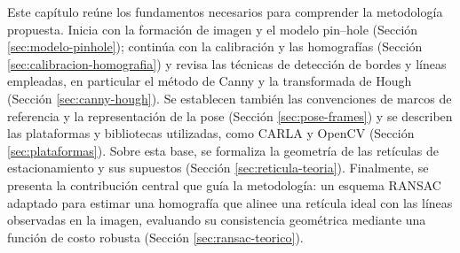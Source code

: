 \noindent  Este   capítulo  reúne  los  fundamentos   necesarios  para
comprender la metodología propuesta. Inicia con la formación de imagen
y el modelo pin--hole (Sección \ref{sec:modelo-pinhole}); continúa con
la       calibración       y      las       homografías       (Sección
\ref{sec:calibracion-homografia}) y  revisa las técnicas  de detección
de bordes  y líneas empleadas, en  particular el método de  Canny y la
transformada de  Hough (Sección \ref{sec:canny-hough}).  Se establecen
también las convenciones  de marcos de referencia  y la representación
de  la  pose  (Sección   \ref{sec:pose-frames})  y  se  describen  las
plataformas  y bibliotecas  utilizadas, como  CARLA y  OpenCV (Sección
\ref{sec:plataformas}). Sobre esta base,  se formaliza la geometría de
las   retículas   de   estacionamiento  y   sus   supuestos   (Sección
\ref{sec:reticula-teoria}).  Finalmente, se  presenta la  contribución
central  que guía  la  metodología: un  esquema  RANSAC adaptado  para
estimar una  homografía que alinee  una retícula ideal con  las líneas
observadas en la imagen, evaluando su consistencia geométrica mediante
una función de costo robusta (Sección \ref{sec:ransac-teorico}).
